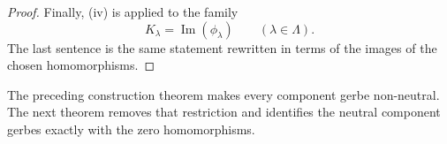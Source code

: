 \begin{proof}
Finally, \textup{(iv)} is  applied to the family
\[
K_\lambda=\operatorname{Im}(\phi_\lambda)
\qquad
(\lambda\in\Lambda).
\]
The last sentence is the same statement rewritten in terms of the images of the chosen homomorphisms.
\end{proof}

The preceding construction theorem makes every component gerbe non-neutral. The next theorem removes that restriction and identifies the neutral component gerbes exactly with the zero homomorphisms.
